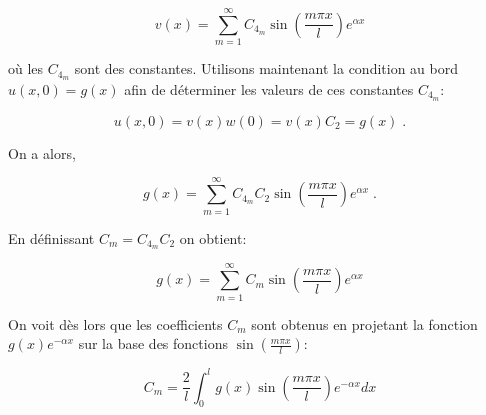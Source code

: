 \documentclass[a4paper, 12pt]{report}
\begin{document}
\begin{equation}
  v(x) = \sum_{m=1}^{\infty} C_{4_m} \sin \left (\frac{m \pi x}{l} \right ) e^{\alpha x}
\end{equation}

où les $C_{4_m}$ sont des constantes. Utilisons maintenant la condition au bord
$u(x,0) = g(x)$ afin de déterminer les valeurs de ces constantes $C_{4_m}$:

\begin{equation}
  u(x,0) = v(x) w(0) = v(x) C_{2} = g(x)\;.
\end{equation}

On a alors,

\begin{equation}
  g(x) = \sum_{m=1}^{\infty} C_{4_m}C_{2} \sin \left (\frac{m \pi x}{l} \right ) e^{\alpha x}\;.
\end{equation}

En définissant $C_m = C_{4_m}C_{2}$ on obtient:

\begin{equation}
  g(x) = \sum_{m=1}^{\infty} C_m \sin \left (\frac{m \pi x}{l} \right ) e^{\alpha x}
\end{equation}

On voit dès lors que les coefficients $C_m$ sont obtenus
en projetant la fonction $g(x)e^{-\alpha x}$ sur la base des fonctions $\sin \left (\frac{m \pi x}{l} \right )$:

\begin{equation}
  C_m = \frac{2}{l} \int_0^l g(x) \sin \left (\frac{m \pi x}{l} \right ) e^{-\alpha x} dx
\end{equation}




\end{document}
